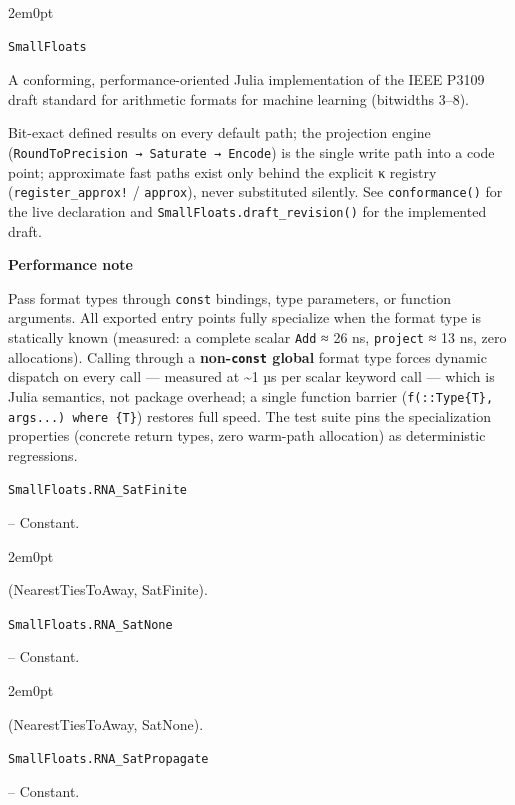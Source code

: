 \begin{adjustwidth}{2em}{0pt}


\begin{verbatim}
SmallFloats
\end{verbatim}

A conforming, performance-oriented Julia implementation of the IEEE P3109 draft standard for arithmetic formats for machine learning (bitwidths 3–8).

Bit-exact defined results on every default path; the projection engine (\texttt{RoundToPrecision → Saturate → Encode}) is the single write path into a code point; approximate fast paths exist only behind the explicit κ registry (\texttt{register\_approx!} / \texttt{approx}), never substituted silently. See \texttt{conformance()} for the live declaration and \texttt{SmallFloats.draft\_revision()} for the implemented draft.

\textbf{Performance note}

Pass format types through \texttt{const} bindings, type parameters, or function arguments. All exported entry points fully specialize when the format type is statically known (measured: a complete scalar \texttt{Add} ≈ 26 ns, \texttt{project} ≈ 13 ns, zero allocations). Calling through a \textbf{non-\texttt{const} global} format type forces dynamic dispatch on every call — measured at {\textasciitilde}1 µs per scalar keyword call — which is Julia semantics, not package overhead; a single function barrier (\texttt{f(::Type\{T\}, args...) where \{T\}}) restores full speed. The test suite pins the specialization properties (concrete return types, zero warm-path allocation) as deterministic regressions.



\end{adjustwidth}
\hypertarget{8725867475956632017}{\texttt{SmallFloats.RNA\_SatFinite}}  -- {Constant.}

\begin{adjustwidth}{2em}{0pt}

(NearestTiesToAway, SatFinite).



\end{adjustwidth}
\hypertarget{16426343133939897049}{\texttt{SmallFloats.RNA\_SatNone}}  -- {Constant.}

\begin{adjustwidth}{2em}{0pt}

(NearestTiesToAway, SatNone).



\end{adjustwidth}
\hypertarget{9948955282984860181}{\texttt{SmallFloats.RNA\_SatPropagate}}  -- {Constant.}

